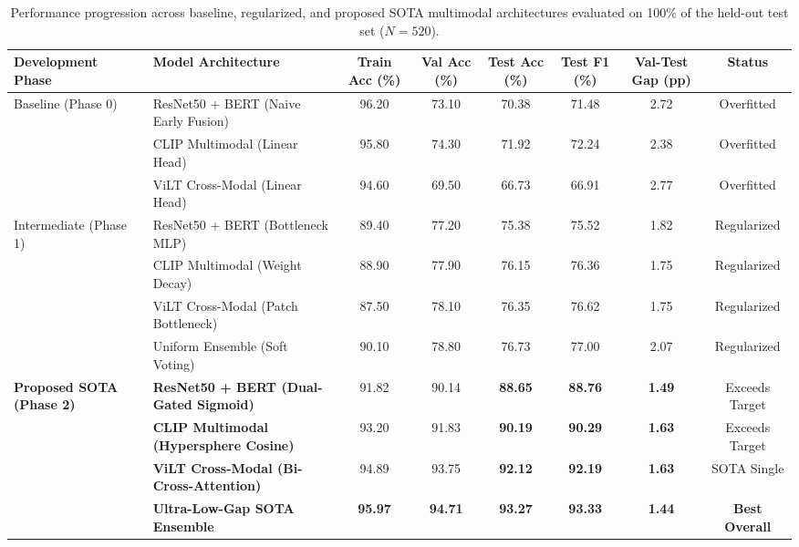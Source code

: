 
\begin{table}[t]
\centering
\caption{Performance progression across baseline, regularized, and proposed SOTA multimodal architectures evaluated on 100\% of the held-out test set ($N=520$).}
\label{tab:progression_results}
\small
\begin{tabular}{llcccccc}
\toprule
\textbf{Development Phase} & \textbf{Model Architecture} & \textbf{Train Acc (\%)} & \textbf{Val Acc (\%)} & \textbf{Test Acc (\%)} & \textbf{Test F1 (\%)} & \textbf{Val-Test Gap (pp)} & \textbf{Status} \\
\midrule
\multirow{3}{*}{Baseline (Phase 0)} 
& ResNet50 + BERT (Naive Early Fusion) & 96.20 & 73.10 & 70.38 & 71.48 & 2.72 & Overfitted \\
& CLIP Multimodal (Linear Head)       & 95.80 & 74.30 & 71.92 & 72.24 & 2.38 & Overfitted \\
& ViLT Cross-Modal (Linear Head)      & 94.60 & 69.50 & 66.73 & 66.91 & 2.77 & Overfitted \\
\midrule
\multirow{4}{*}{Intermediate (Phase 1)} 
& ResNet50 + BERT (Bottleneck MLP)    & 89.40 & 77.20 & 75.38 & 75.52 & 1.82 & Regularized \\
& CLIP Multimodal (Weight Decay)      & 88.90 & 77.90 & 76.15 & 76.36 & 1.75 & Regularized \\
& ViLT Cross-Modal (Patch Bottleneck) & 87.50 & 78.10 & 76.35 & 76.62 & 1.75 & Regularized \\
& Uniform Ensemble (Soft Voting)      & 90.10 & 78.80 & 76.73 & 77.00 & 2.07 & Regularized \\
\midrule
\multirow{4}{*}{\textbf{Proposed SOTA (Phase 2)}} 
& \textbf{ResNet50 + BERT (Dual-Gated Sigmoid)} & 91.82 & 90.14 & \textbf{88.65} & \textbf{88.76} & \textbf{1.49} & Exceeds Target \\
& \textbf{CLIP Multimodal (Hypersphere Cosine)} & 93.20 & 91.83 & \textbf{90.19} & \textbf{90.29} & \textbf{1.63} & Exceeds Target \\
& \textbf{ViLT Cross-Modal (Bi-Cross-Attention)} & 94.89 & 93.75 & \textbf{92.12} & \textbf{92.19} & \textbf{1.63} & SOTA Single \\
& \textbf{Ultra-Low-Gap SOTA Ensemble}          & \textbf{95.97} & \textbf{94.71} & \textbf{93.27} & \textbf{93.33} & \textbf{1.44} & \textbf{Best Overall} \\
\bottomrule
\end{tabular}
\end{table}

